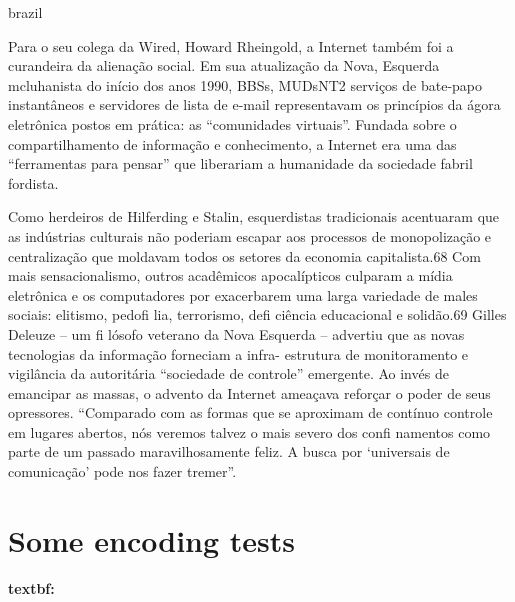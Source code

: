 \begin{otherlanguage*}{brazil}
\begin{citacao}
Para o seu colega da Wired, Howard Rheingold, a Internet também
foi a curandeira da alienação social. Em sua atualização da Nova,
Esquerda mcluhanista do início dos anos 1990, BBSs, MUDsNT2
serviços de bate-papo instantâneos e servidores de lista de e-mail representavam os princípios da ágora eletrônica postos em prática: as “comunidades virtuais”. Fundada sobre o compartilhamento de informação e conhecimento, a Internet era uma das “ferramentas para pensar” que liberariam a humanidade da sociedade fabril fordista. \cite[350]{Barbrook2009}
\end{citacao}

\begin{citacao}
Como herdeiros de Hilferding e Stalin, esquerdistas tradicionais acentuaram que as indústrias culturais não poderiam escapar aos processos de monopolização e centralização que moldavam todos os setores da economia capitalista.68
Com mais sensacionalismo,
outros acadêmicos apocalípticos culparam a mídia eletrônica e os computadores por exacerbarem uma larga variedade de males sociais: elitismo, pedofi lia,
terrorismo, defi ciência educacional e solidão.69 Gilles Deleuze – um fi lósofo veterano da Nova Esquerda
– advertiu que as novas tecnologias da informação forneciam a infra- estrutura de monitoramento e vigilância da autoritária “sociedade de controle” emergente. Ao invés de emancipar as massas, o advento da Internet ameaçava reforçar o poder de seus opressores. “Comparado com as formas que se aproximam de contínuo controle em lugares abertos, nós veremos talvez o mais severo dos confi namentos como parte de um passado maravilhosamente feliz. A busca por ‘universais de comunicação’ pode nos fazer tremer”.\cite[359]{Barbrook2009}
\end{citacao}


    \newpage

     \emph{}

    \section*[Some encoding tests]{Some encoding tests}

    \sloppy
    \textbf{textbf:  }
    \fussy

\end{otherlanguage*}




